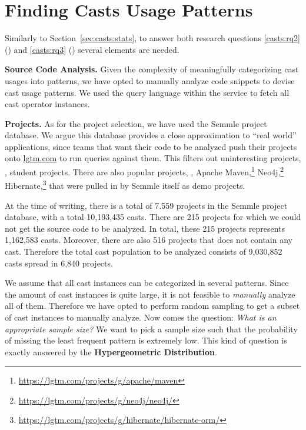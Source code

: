 \section{Finding Casts Usage Patterns}
\label{sec:casts:methodology}

Similarly to Section~\ref{sec:casts:stats}, to answer both research questions
\ref{casts:rq2} (\emph{\crqB}) and \ref{casts:rq3} (\emph{\crqC}) several elements are needed.

\textbf{Source Code Analysis.}
Given the complexity of meaningfully categorizing cast usages into patterns,
we have opted to manually analyze code snippets to devise cast usage patterns.
We used the \ql{} query language within the \lgtm{} service to fetch all cast operator instances.

\textbf{Projects.}
As for the project selection, we have used the Semmle project database.
We argue this database provides a close approximation to ``real world'' applications, since teams that want their code to be analyzed push their projects onto \href{https://lgtm.com}{lgtm.com} to run queries against them.
This filters out uninteresting projects, \eg, student projects.
There are also popular projects, \eg,
Apache Maven,\footnote{\url{https://lgtm.com/projects/g/apache/maven}}
Neo4j,\footnote{\url{https://lgtm.com/projects/g/neo4j/neo4j/}}
Hibernate,\footnote{\url{https://lgtm.com/projects/g/hibernate/hibernate-orm/}}
that were pulled in by Semmle itself as demo projects.


At the time of writing, there is a total of 7.559 projects in the Semmle project database, with a total 10,193,435 casts.
There are 215 projects for which we could not get the source code to be analyzed.
In total, these 215 projects represents 1,162,583 casts.
Moreover, there are also 516 projects that does not contain any cast.
Therefore the total cast population to be analyzed consists of 9,030,852 casts spread in 6,840 projects.

We assume that all cast instances can be categorized in several patterns.
Since the amount of cast instances is quite large, it is not feasible to \emph{manually} analyze all of them.
Therefore we have opted to perform random sampling to get a subset of cast instances to manually analyze.
Now comes the question: \emph{What is an appropriate sample size?}
We want to pick a sample size such that the probability of missing the least frequent pattern is extremely low.
This kind of question is exactly answered by the \textbf{Hypergeometric Distribution}.

